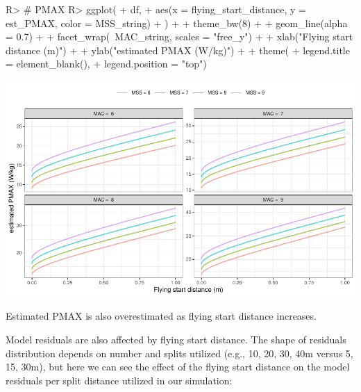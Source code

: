 \documentclass[
]{jss}
\begin{document}
\begin{CodeChunk}
\begin{CodeInput}
R> # PMAX
R> ggplot(
+   df,
+   aes(x = flying_start_distance, y = est_PMAX, color = MSS_string)
+ ) +
+   theme_bw(8) +
+   geom_line(alpha = 0.7) +
+   facet_wrap(~MAC_string, scales = "free_y") +
+   xlab("Flying start distance (m)") +
+   ylab("estimated PMAX (W/kg)") +
+   theme(
+     legend.title = element_blank(), 
+     legend.position = "top")
\end{CodeInput}


\begin{center}\includegraphics[width=1\linewidth]{paper_files/figure-latex/unnamed-chunk-26-1} \end{center}

\end{CodeChunk}

Estimated PMAX is also overestimated as flying start distance increases.

Model residuals are also affected by flying start distance. The shape of residuals distribution depends on number and splits utilized (e.g., 10, 20, 30, 40m versus 5, 15, 30m), but here we can see the effect of the flying start distance on the model residuals per split distance utilized in our simulation:
\end{document}

